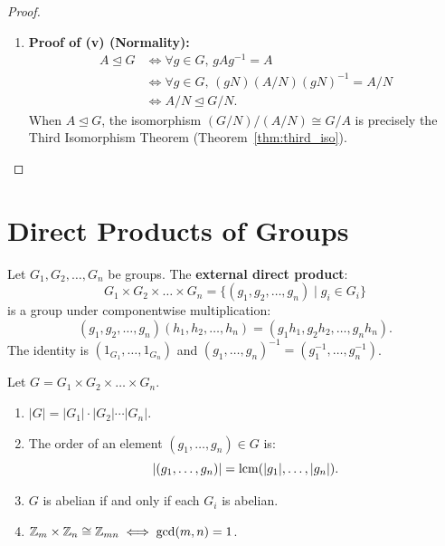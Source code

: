 \begin{proof}
\begin{enumerate}[label=\arabic*., leftmargin=*]
    \item \textbf{Proof of (v) (Normality):}
    \begin{align*}
    A \trianglelefteq G 
    &\iff \forall g \in G, \, gAg^{-1} = A \\
    &\iff \forall g \in G, \, (gN)(A/N)(gN)^{-1} = A/N \\
    &\iff A/N \trianglelefteq G/N.
    \end{align*}
    When $A \trianglelefteq G$, the isomorphism $(G/N)/(A/N) \cong G/A$ is precisely the Third Isomorphism Theorem (Theorem~\ref{thm:third_iso}).
\end{enumerate}
\end{proof}

\section{Direct Products of Groups}
\label{sec:direct_products}

\begin{definition}
Let $G_1, G_2, \dots, G_n$ be groups. The \textbf{external direct product}:
\begin{equation}
G_1 \times G_2 \times \dots \times G_n = \{ (g_1, g_2, \dots, g_n) \mid g_i \in G_i \}
\end{equation}
is a group under componentwise multiplication:
\begin{equation}
(g_1, g_2, \dots, g_n)(h_1, h_2, \dots, h_n) = (g_1 h_1, g_2 h_2, \dots, g_n h_n).
\end{equation}
The identity is $(1_{G_1}, \dots, 1_{G_n})$ and $(g_1, \dots, g_n)^{-1} = (g_1^{-1}, \dots, g_n^{-1})$.
\end{definition}

\begin{proposition}
\label{prop:direct_product_props}
Let $G = G_1 \times G_2 \times \dots \times G_n$.
\begin{enumerate}[label=\textbf{(\roman*)}, leftmargin=*, itemsep=4pt]
    \item $|G| = |G_1| \cdot |G_2| \cdots |G_n|$.
    \item The order of an element $(g_1, \dots, g_n) \in G$ is:
    \begin{equation}
    |(g_1, \dots, g_n)| = \operatorname{lcm}(|g_1|, \dots, |g_n|).
    \end{equation}
    \item $G$ is abelian if and only if each $G_i$ is abelian.
    \item $\mathbb{Z}_m \times \mathbb{Z}_n \cong \mathbb{Z}_{mn} \iff \gcd(m, n) = 1$.
\end{enumerate}
\end{proposition}

